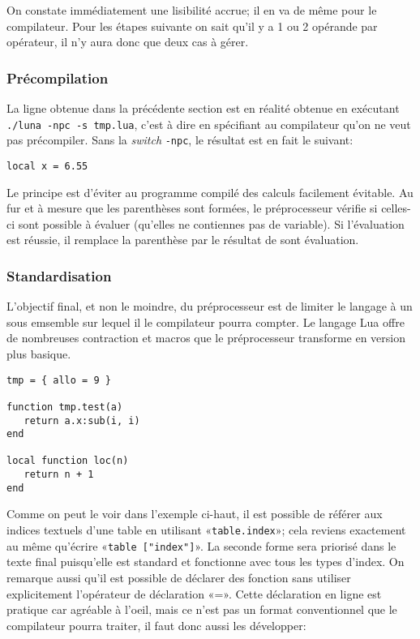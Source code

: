 \documentclass{article}
\begin{document}
On constate immédiatement une lisibilité accrue; il en va de même pour le compilateur. Pour les étapes suivante on sait qu'il y a 1 ou 2 opérande par opérateur, il n'y aura donc que deux cas à gérer.
\subsubsection{Précompilation}
La ligne obtenue dans la précédente section est en réalité obtenue en exécutant \texttt{./luna -npc -s tmp.lua}, c'est à dire en spécifiant au compilateur qu'on ne veut pas précompiler. Sans la \textit{switch} \texttt{-npc}, le résultat est en fait le suivant:
\begin{lstlisting}[belowcaptionskip = -1\baselineskip]
local x = 6.55
\end{lstlisting}


Le principe est d'éviter au programme compilé des calculs facilement évitable. Au fur et à mesure que les parenthèses sont formées, le préprocesseur vérifie si celles-ci sont possible à évaluer (qu'elles ne contiennes pas de variable). Si l'évaluation est réussie, il remplace la parenthèse par le résultat de sont évaluation.

\subsubsection{Standardisation}
L'objectif final, et non le moindre, du préprocesseur est de limiter le langage à un sous emsemble sur lequel il le compilateur pourra compter. Le langage Lua offre de nombreuses contraction et macros que le préprocesseur transforme en version plus basique.
\begin{lstlisting}[caption={Utilisation des contractions et des macros},label=DescriptiveLabel]
tmp = { allo = 9 }

function tmp.test(a)
   return a.x:sub(i, i)
end

local function loc(n)
   return n + 1
end
\end{lstlisting}

Comme on peut le voir dans l'exemple ci-haut, il est possible de référer aux indices textuels d'une table en utilisant «\texttt{table.index}»; cela reviens exactement au même qu'écrire «\texttt{table ["index"]}». La seconde forme sera priorisé dans le texte final puisqu'elle est standard et fonctionne avec tous les types d'index. On remarque aussi qu'il est possible de déclarer des fonction sans utiliser explicitement l'opérateur de déclaration «=». Cette déclaration en ligne est pratique car agréable à l'oeil, mais ce n'est pas un format conventionnel que le compilateur pourra traiter, il faut donc aussi les développer:
\end{document}
